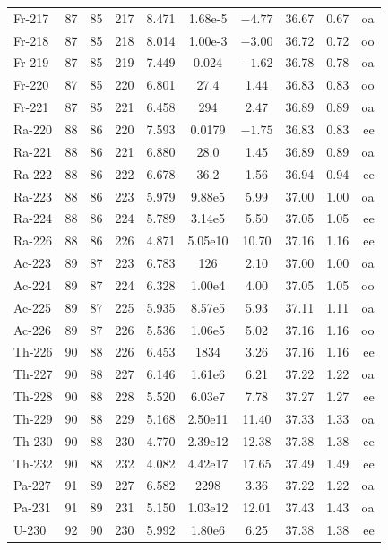 \begin{longtable}{lccccccccr}
Fr-217 & 87 & 85 & 217 & 8.471 & 1.68e-5 & $-4.77$ & 36.67 & 0.67 & oa \\
Fr-218 & 87 & 85 & 218 & 8.014 & 1.00e-3 & $-3.00$ & 36.72 & 0.72 & oo \\
Fr-219 & 87 & 85 & 219 & 7.449 & 0.024 & $-1.62$ & 36.78 & 0.78 & oa \\
Fr-220 & 87 & 85 & 220 & 6.801 & 27.4 & 1.44 & 36.83 & 0.83 & oo \\
Fr-221 & 87 & 85 & 221 & 6.458 & 294 & 2.47 & 36.89 & 0.89 & oa \\
Ra-220 & 88 & 86 & 220 & 7.593 & 0.0179 & $-1.75$ & 36.83 & 0.83 & ee \\
Ra-221 & 88 & 86 & 221 & 6.880 & 28.0 & 1.45 & 36.89 & 0.89 & oa \\
Ra-222 & 88 & 86 & 222 & 6.678 & 36.2 & 1.56 & 36.94 & 0.94 & ee \\
Ra-223 & 88 & 86 & 223 & 5.979 & 9.88e5 & 5.99 & 37.00 & 1.00 & oa \\
Ra-224 & 88 & 86 & 224 & 5.789 & 3.14e5 & 5.50 & 37.05 & 1.05 & ee \\
Ra-226 & 88 & 86 & 226 & 4.871 & 5.05e10 & 10.70 & 37.16 & 1.16 & ee \\
Ac-223 & 89 & 87 & 223 & 6.783 & 126 & 2.10 & 37.00 & 1.00 & oa \\
Ac-224 & 89 & 87 & 224 & 6.328 & 1.00e4 & 4.00 & 37.05 & 1.05 & oo \\
Ac-225 & 89 & 87 & 225 & 5.935 & 8.57e5 & 5.93 & 37.11 & 1.11 & oa \\
Ac-226 & 89 & 87 & 226 & 5.536 & 1.06e5 & 5.02 & 37.16 & 1.16 & oo \\
Th-226 & 90 & 88 & 226 & 6.453 & 1834 & 3.26 & 37.16 & 1.16 & ee \\
Th-227 & 90 & 88 & 227 & 6.146 & 1.61e6 & 6.21 & 37.22 & 1.22 & oa \\
Th-228 & 90 & 88 & 228 & 5.520 & 6.03e7 & 7.78 & 37.27 & 1.27 & ee \\
Th-229 & 90 & 88 & 229 & 5.168 & 2.50e11 & 11.40 & 37.33 & 1.33 & oa \\
Th-230 & 90 & 88 & 230 & 4.770 & 2.39e12 & 12.38 & 37.38 & 1.38 & ee \\
Th-232 & 90 & 88 & 232 & 4.082 & 4.42e17 & 17.65 & 37.49 & 1.49 & ee \\
Pa-227 & 91 & 89 & 227 & 6.582 & 2298 & 3.36 & 37.22 & 1.22 & oa \\
Pa-231 & 91 & 89 & 231 & 5.150 & 1.03e12 & 12.01 & 37.43 & 1.43 & oa \\
U-230 & 92 & 90 & 230 & 5.992 & 1.80e6 & 6.25 & 37.38 & 1.38 & ee \\

\end{longtable}
